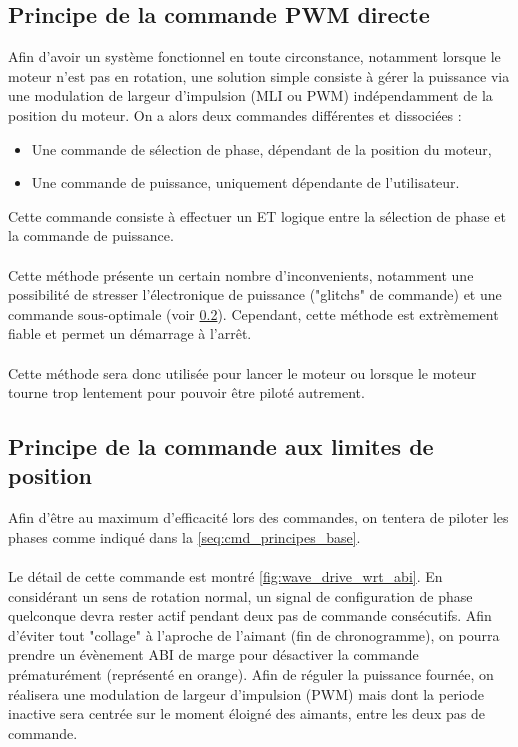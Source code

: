 \subsection{Principe de la commande PWM directe}

Afin d'avoir un système fonctionnel en toute circonstance, notamment lorsque le moteur n'est pas en rotation, 
une solution simple consiste à gérer la puissance via une modulation de largeur d'impulsion (MLI ou PWM) indépendamment de la position du moteur.
On a alors deux commandes différentes et dissociées :
\begin{itemize}
    \item Une commande de sélection de phase, dépendant de la position du moteur,
    \item Une commande de puissance, uniquement dépendante de l'utilisateur.
\end{itemize}

Cette commande consiste à effectuer un ET logique entre la sélection de phase et la commande de puissance.

\paragraph{}
Cette méthode présente un certain nombre d'inconvenients, notamment une possibilité de stresser l'électronique de puissance ("glitchs" de commande) et une commande sous-optimale (voir \cref{sec:cmd_limite_position}).
Cependant, cette méthode est extrèmement fiable et permet un démarrage à l'arrêt. 

\paragraph{}
Cette méthode sera donc utilisée pour lancer le moteur ou lorsque le moteur tourne trop lentement pour pouvoir être piloté autrement.

\subsection{Principe de la commande aux limites de position}
\label{sec:cmd_limite_position}
Afin d'être au maximum d'efficacité lors des commandes, on tentera de piloter les phases comme indiqué dans la \cref{seq:cmd_principes_base}.

\paragraph{}
Le détail de cette commande est montré \cref{fig:wave_drive_wrt_abi}. 
En considérant un sens de rotation normal, un signal de configuration de phase quelconque devra rester actif pendant deux pas de commande consécutifs.
Afin d'éviter tout "collage" à l'aproche de l'aimant (fin de chronogramme), on pourra prendre un évènement ABI de marge pour désactiver la commande prématurément (représenté en orange).
Afin de réguler la puissance fournée, on réalisera une modulation de largeur d'impulsion (PWM) mais dont la periode inactive sera centrée sur le moment éloigné des aimants, entre les deux pas de commande.

